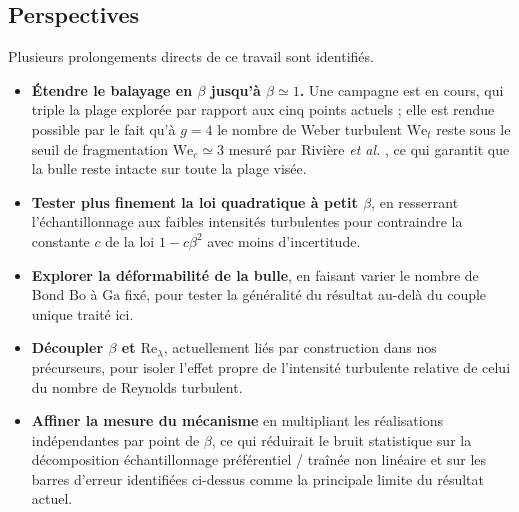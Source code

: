 \subsection{Perspectives}
\label{sec:perspectives}

Plusieurs prolongements directs de ce travail sont identifiés.

\begin{itemize}
    \item \textbf{Étendre le balayage en $\beta$ jusqu'à $\beta\simeq1$.} Une
    campagne est en cours, qui triple la plage explorée par rapport aux cinq
    points actuels ; elle est rendue possible par le fait qu'à $g=4$ le nombre de
    Weber turbulent $\mathrm{We}_t$ reste sous le seuil de fragmentation
    $\mathrm{We}_c\simeq3$ mesuré par Rivière \emph{et al.} \cite{riviere2021},
    ce qui garantit que la bulle reste intacte sur toute la plage visée.
    \item \textbf{Tester plus finement la loi quadratique à petit $\beta$}, en
    resserrant l'échantillonnage aux faibles intensités turbulentes pour
    contraindre la constante $c$ de la loi $1-c\beta^2$ avec moins
    d'incertitude.
    \item \textbf{Explorer la déformabilité de la bulle}, en faisant varier le
    nombre de Bond $\mathrm{Bo}$ à $\mathrm{Ga}$ fixé, pour tester la
    généralité du résultat au-delà du couple unique traité ici.
    \item \textbf{Découpler $\beta$ et $\mathrm{Re}_\lambda$}, actuellement liés
    par construction dans nos précurseurs, pour isoler l'effet propre de
    l'intensité turbulente relative de celui du nombre de Reynolds turbulent.
    \item \textbf{Affiner la mesure du mécanisme} en multipliant les
    réalisations indépendantes par point de $\beta$, ce qui réduirait le bruit
    statistique sur la décomposition échantillonnage préférentiel / traînée non
    linéaire et sur les barres d'erreur identifiées ci-dessus comme la
    principale limite du résultat actuel.
\end{itemize}
